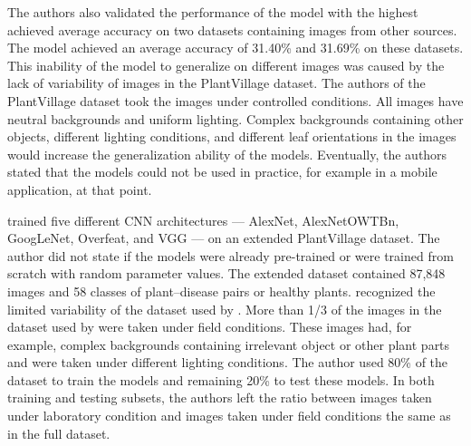 \documentclass{BachelorBUI}
\begin{document}
        The authors also validated the performance of the model with the highest achieved average accuracy on two datasets containing images from other sources. The model achieved an average accuracy of 31.40\% and 31.69\% on these datasets. This inability of the model to generalize on different images was caused by the lack of variability of images in the PlantVillage dataset. The authors of the PlantVillage dataset took the images under controlled conditions. All images have neutral backgrounds and uniform lighting. Complex backgrounds containing other objects, different lighting conditions, and different leaf orientations in the images would increase the generalization ability of the models. Eventually, the authors stated that the models could not be used in practice, for example in a mobile application, at that point.

        \textcite{Ferentinos:2018} trained five different CNN architectures --- AlexNet, AlexNetOWTBn, GoogLeNet, Overfeat, and VGG --- on an extended PlantVillage dataset. The author did not state if the models were already pre-trained or were trained from scratch with random parameter values. The extended dataset contained 87,848 images and 58 classes of plant--disease pairs or healthy plants. \textcite{Ferentinos:2018} recognized the limited variability of the dataset used by \textcite{Mohanty:2016}. More than 1/3 of the images in the dataset used by \textcite{Ferentinos:2018} were taken under field conditions. These images had, for example, complex backgrounds containing irrelevant object or other plant parts and were taken under different lighting conditions. The author used 80\% of the dataset to train the models and remaining 20\% to test these models. In both training and testing subsets, the authors left the ratio between images taken under laboratory condition and images taken under field conditions the same as in the full dataset.
\end{document}
